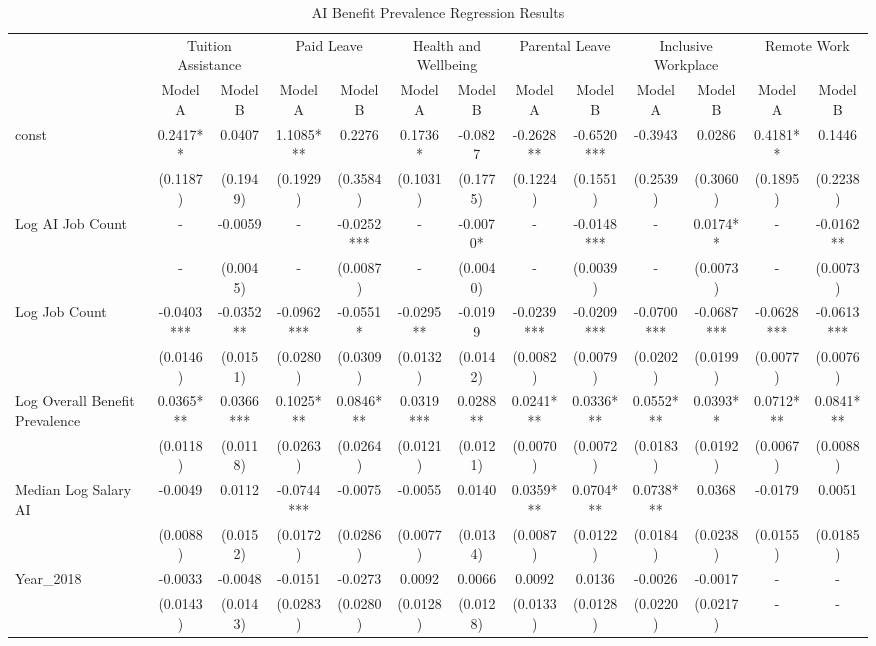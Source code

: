 \begin{table}[htbp]
\centering
\caption{AI Benefit Prevalence Regression Results}
\begin{tabular}{lcccccccccccc}
\hline\hline
 & \multicolumn{2}{c}{Tuition Assistance} & \multicolumn{2}{c}{Paid Leave} & \multicolumn{2}{c}{Health and Wellbeing} & \multicolumn{2}{c}{Parental Leave} & \multicolumn{2}{c}{Inclusive Workplace} & \multicolumn{2}{c}{Remote Work} \\
 & Model A & Model B & Model A & Model B & Model A & Model B & Model A & Model B & Model A & Model B & Model A & Model B \\
\hline
const & 0.2417** & 0.0407 & 1.1085*** & 0.2276 & 0.1736* & -0.0827 & -0.2628** & -0.6520*** & -0.3943 & 0.0286 & 0.4181** & 0.1446 \\
 & (0.1187) & (0.1949) & (0.1929) & (0.3584) & (0.1031) & (0.1775) & (0.1224) & (0.1551) & (0.2539) & (0.3060) & (0.1895) & (0.2238) \\
Log AI Job Count & - & -0.0059 & - & -0.0252*** & - & -0.0070* & - & -0.0148*** & - & 0.0174** & - & -0.0162** \\
 & - & (0.0045) & - & (0.0087) & - & (0.0040) & - & (0.0039) & - & (0.0073) & - & (0.0073) \\
Log Job Count & -0.0403*** & -0.0352** & -0.0962*** & -0.0551* & -0.0295** & -0.0199 & -0.0239*** & -0.0209*** & -0.0700*** & -0.0687*** & -0.0628*** & -0.0613*** \\
 & (0.0146) & (0.0151) & (0.0280) & (0.0309) & (0.0132) & (0.0142) & (0.0082) & (0.0079) & (0.0202) & (0.0199) & (0.0077) & (0.0076) \\
Log Overall Benefit Prevalence & 0.0365*** & 0.0366*** & 0.1025*** & 0.0846*** & 0.0319*** & 0.0288** & 0.0241*** & 0.0336*** & 0.0552*** & 0.0393** & 0.0712*** & 0.0841*** \\
 & (0.0118) & (0.0118) & (0.0263) & (0.0264) & (0.0121) & (0.0121) & (0.0070) & (0.0072) & (0.0183) & (0.0192) & (0.0067) & (0.0088) \\
Median Log Salary AI & -0.0049 & 0.0112 & -0.0744*** & -0.0075 & -0.0055 & 0.0140 & 0.0359*** & 0.0704*** & 0.0738*** & 0.0368 & -0.0179 & 0.0051 \\
 & (0.0088) & (0.0152) & (0.0172) & (0.0286) & (0.0077) & (0.0134) & (0.0087) & (0.0122) & (0.0184) & (0.0238) & (0.0155) & (0.0185) \\
Year\_2018 & -0.0033 & -0.0048 & -0.0151 & -0.0273 & 0.0092 & 0.0066 & 0.0092 & 0.0136 & -0.0026 & -0.0017 & - & - \\
 & (0.0143) & (0.0143) & (0.0283) & (0.0280) & (0.0128) & (0.0128) & (0.0133) & (0.0128) & (0.0220) & (0.0217) & - & - \\

\end{tabular}
\end{table}
